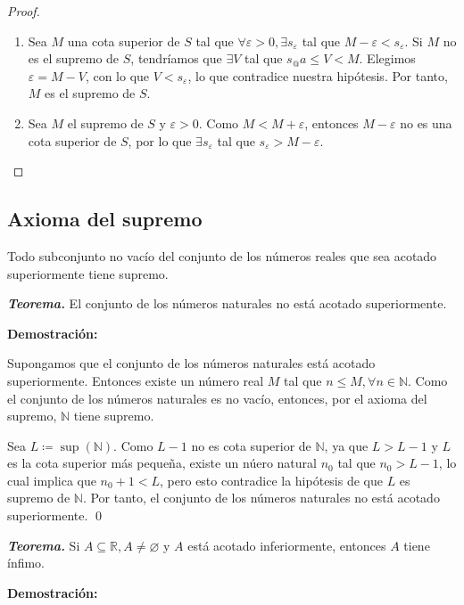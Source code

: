 \documentclass[11pt]{article}
\newcommand{\N}{\mathbb{N}}
\newcommand{\R}{\mathbb{R}}
\let\epsilon\varepsilon
\let\emptyset\varnothing
\begin{document}
\begin{enumerate}
    \vspace{-1em}\begin{proof} 
        \begin{enumerate}[label=\roman*)]
            \item Sea $M$ una cota superior de $S$ tal que $\forall \epsilon>0, \exists s_{\epsilon}$ tal que $M-\epsilon<s_{\epsilon}$. Si $M$ no es el supremo de $S$, tendríamos que $\exists V$ tal que $s_@a \leq V < M$. Elegimos $\epsilon = M-V$, con lo que $V<s_{\epsilon}$, lo que contradice nuestra hipótesis. Por tanto, $M$ es el supremo de $S$.
            \item Sea $M$ el supremo de $S$ y $\epsilon>0$. Como $M<M+\epsilon$, entonces $M-\epsilon$ no es una cota superior de $S$, por lo que $\exists s_\epsilon$ tal que $s_\epsilon>M-\epsilon$. \qedhere
            \end{enumerate}    
    \end{proof} \vspace{-1em}
\end{enumerate}

\subsection*{Axioma del supremo}

Todo subconjunto no vacío del conjunto de los números reales que sea acotado superiormente tiene supremo.

\textbf{\textit{Teorema.}} El conjunto de los números naturales no está acotado superiormente.

\textbf{Demostración:}

Supongamos que el conjunto de los números naturales está acotado superiormente. Entonces existe un número real $M$ tal que $n\leq M, \forall n\in \N$. Como el conjunto de los números naturales es no vacío, entonces, por el axioma del supremo, $\N$ tiene supremo.

Sea $L\coloneqq \sup{(\N)}$. Como $L-1$ no es cota superior de $\N$, ya que $L>L-1$ y $L$ es la cota superior más pequeña, existe un núero natural $n_0$ tal que $n_0>L-1$, lo cual implica que $n_0+1<L$, pero esto contradice la hipótesis	de que $L$ es supremo de $\N$. Por tanto, el conjunto de los números naturales no está acotado superiormente. \qed

\textbf{\textit{Teorema.}} Si $A\subseteq \R, A\neq \emptyset$ y $A$ está acotado inferiormente, entonces $A$ tiene ínfimo.

\textbf{Demostración:}
\end{document}
